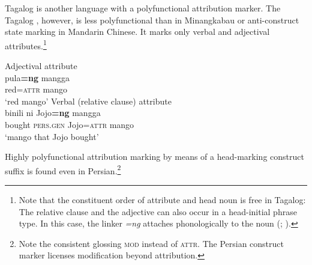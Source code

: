 Tagalog is another language with a polyfunctional attribution marker. The Tagalog , however, is less polyfunctional than  in Minangkabau or anti\hyp{}construct state marking in Mandarin Chinese. It marks only verbal and adjectival attributes.\footnote{Note that the constituent order of attribute and head noun is free in Tagalog: The relative clause and the adjective can also occur in a head-initial phrase type. In this case, the linker \textit{=ng} attaches phonologically to the noun (\citealt[1]{gil2005}; \citealt[160, 162]{himmelmann1997}).}
\begin{exe}
\ex 
{} \label{multi tagalog}
\begin{xlist}
\ex \rm{Adjectival attribute}\\
\gll	pula\textbf{=ng} mangga\\
	red{=\textsc{attr}} mango\\
\glt	‘red mango’
\ex \rm{Verbal (relative clause) attribute}\\
\gll	binili ni Jojo\textbf{=ng} mangga\\
	bought \textsc{pers.gen} Jojo{=\textsc{attr}} mango\\
\glt	‘mango that Jojo bought’
\end{xlist}
\end{exe}
Highly polyfunctional attribution marking by means of a head-marking construct suffix is found even in Persian.\footnote{Note the consistent glossing \textsc{mod} instead of \textsc{attr}. The Persian construct marker licenses modification beyond attribution.}
